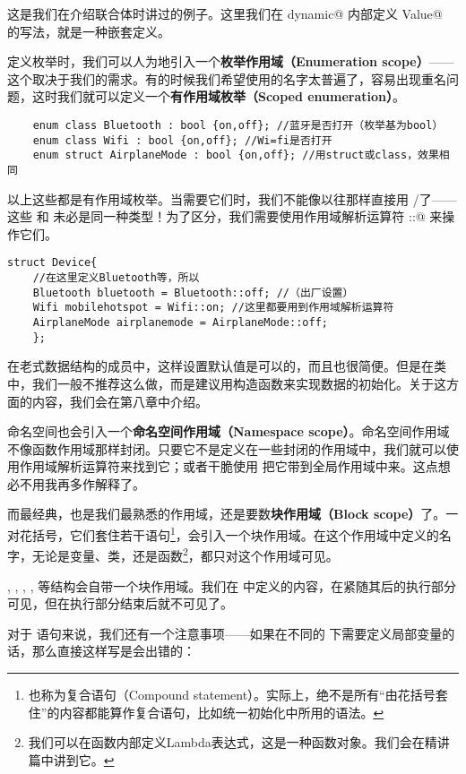 这是我们在介绍联合体时讲过的例子。这里我们在 \lstinline@struct dynamic@ 内部定义 \lstinline@union Value@ 的写法，就是一种嵌套定义。\par
定义枚举时，我们可以人为地引入一个\textbf{枚举作用域（Enumeration scope）}——这个取决于我们的需求。有的时候我们希望使用的名字太普遍了，容易出现重名问题，这时我们就可以定义一个\textbf{有作用域枚举（Scoped enumeration）}。
\begin{lstlisting}
    enum class Bluetooth : bool {on,off}; //蓝牙是否打开（枚举基为bool）
    enum class Wifi : bool {on,off}; //Wi=fi是否打开
    enum struct AirplaneMode : bool {on,off}; //用struct或class，效果相同
\end{lstlisting}
以上这些都是有作用域枚举。当需要它们时，我们不能像以往那样直接用 \lstinline@on@/\lstinline@off@ 了——这些 \lstinline@on@ 和 \lstinline@off@ 未必是同一种类型！为了区分，我们需要使用作用域解析运算符 \lstinline@::@ 来操作它们。
\begin{lstlisting}
struct Device{
    //在这里定义Bluetooth等，所以
    Bluetooth bluetooth = Bluetooth::off; //（出厂设置）
    Wifi mobilehotspot = Wifi::on; //这里都要用到作用域解析运算符
    AirplaneMode airplanemode = AirplaneMode::off;
    };
\end{lstlisting}
在老式数据结构的成员中，这样设置默认值是可以的，而且也很简便。但是在类中，我们一般不推荐这么做，而是建议用构造函数来实现数据的初始化。关于这方面的内容，我们会在第八章中介绍。\par
命名空间也会引入一个\textbf{命名空间作用域（Namespace scope）}。命名空间作用域不像函数作用域那样封闭。只要它不是定义在一些封闭的作用域中，我们就可以使用作用域解析运算符来找到它；或者干脆使用 \lstinline@using@ 把它带到全局作用域中来。这点想必不用我再多作解释了。\par
而最经典，也是我们最熟悉的作用域，还是要数\textbf{块作用域（Block scope）}了。一对花括号，它们套住若干语句\footnote{也称为复合语句（Compound statement）。实际上，绝不是所有``由花括号套住''的内容都能算作复合语句，比如统一初始化中所用的语法。}，会引入一个块作用域。在这个作用域中定义的名字，无论是变量、类，还是函数\footnote{我们可以在函数内部定义Lambda表达式，这是一种函数对象。我们会在精讲篇中讲到它。}，都只对这个作用域可见。\par
\lstinline@for@, \lstinline@while@, \lstinline@if@, \lstinline@else@, \lstinline@switch@ 等结构会自带一个块作用域。我们在 \lstinline@for@ 中定义的内容，在紧随其后的执行部分可见，但在执行部分结束后就不可见了。\par
对于 \lstinline@switch@ 语句来说，我们还有一个注意事项——如果在不同的 \lstinline@case@ 下需要定义局部变量的话，那么直接这样写是会出错的：
